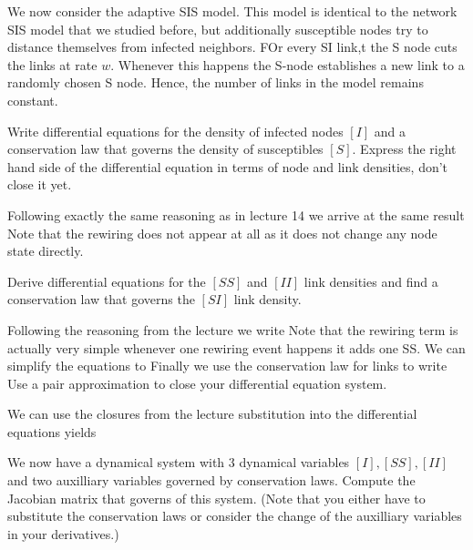 We now consider the adaptive SIS model. This model is identical to the network SIS model that we studied before, but additionally susceptible nodes try to distance themselves from infected neighbors. FOr every SI link,t the S node cuts the links at rate $w$. Whenever this happens the S-node establishes a new link to a randomly chosen S node. Hence, the number of links in the model remains constant. 

\subquestion
Write differential equations for the density of infected nodes $[I]$ and a conservation law that governs the density of susceptibles $[S]$. Express the right hand side of the differential equation in terms of node and link densities, don't close it yet. 

\solution
Following exactly the same reasoning as in lecture 14 we arrive at the same result 
Note that the rewiring does not appear at all as it does not change any node state directly. 

\subquestion
Derive differential equations for the $[SS]$ and $[II]$ link densities and find a conservation law that governs the $[SI]$ link density.

\solution 
Following the reasoning from the lecture we write 
Note that the rewiring term is actually very simple whenever one rewiring event happens it adds one SS. We can simplify the equations to 
Finally we use the conservation law for links 
to write 
\subquestion Use a pair approximation to close your differential equation system.

\solution
We can use the closures from the lecture
substitution into the differential equations yields

\subquestion
We now have a dynamical system with 3 dynamical variables $[I],[SS],[II]$ and two auxilliary variables governed by conservation laws. Compute the Jacobian matrix that governs of this system. (Note that you either have to substitute the conservation laws or consider the change of the auxilliary variables in your derivatives.)  

